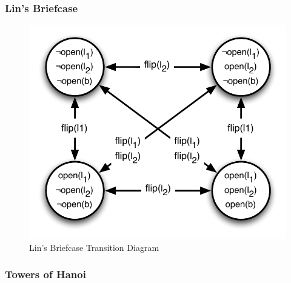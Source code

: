 \subsubsection{Lin's Briefcase}
\begin{figure}[htbp]
    \centering
        \includegraphics[scale=.8]{../images/briefcase.pdf}
    \caption{Lin's Briefcase Transition Diagram}
    \label{fig:briefcase}
\end{figure}


\subsubsection{Towers of Hanoi}
